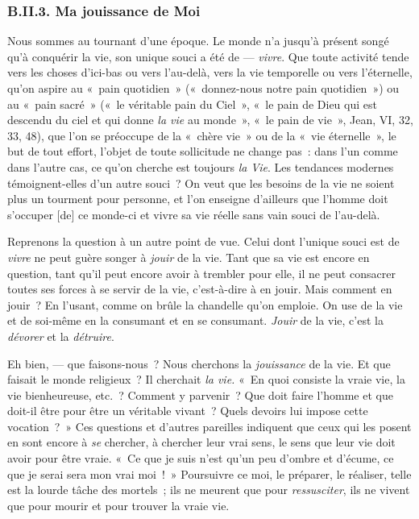 \documentclass[french,twoside]{book} %
\newcommand\corr[1]{#1}
\begin{document}
\subsubsection[{B.II.3. Ma jouissance de Moi}]{B.II.3. Ma jouissance de Moi}
\noindent Nous sommes au tournant d’une époque. Le monde n’a jusqu’à présent songé qu’à conquérir la vie, son unique souci a été de — \emph{vivre}. Que toute activité tende vers les choses d’ici-bas ou vers l’au-delà, vers la vie temporelle ou vers l’éternelle, qu’on aspire au « pain quotidien » (« donnez-nous notre pain quotidien ») ou au « pain sacré » (« le véritable pain du Ciel », « le pain de Dieu qui est descendu du ciel et qui donne \emph{la vie} au monde », « le pain de vie », Jean, VI, 32, 33, 48), que l’on se préoccupe de la « chère vie » ou de la « vie éternelle », le but de tout effort, l’objet de toute sollicitude ne change pas : dans l’un comme dans l’autre cas, ce qu’on cherche est toujours \emph{la Vie}. Les tendances modernes témoignent-elles d’un autre souci ? On veut que les besoins de la vie ne soient plus un tourment pour personne, et l’on enseigne d’ailleurs que l’homme doit s’occuper [{\corr de}] ce monde-ci et vivre sa vie réelle sans vain souci de l’au-delà.\par
Reprenons la question à un autre point de vue. Celui dont l’unique souci est de \emph{vivre} ne peut guère  songer à \emph{jouir} de la vie. Tant que sa vie est encore en question, tant qu’il peut encore avoir à trembler pour elle, il ne peut consacrer toutes ses forces à se servir de la vie, c’est-à-dire à en jouir. Mais comment en jouir ? En l’usant, comme on brûle la chandelle qu’on emploie. On use de la vie et de soi-même en la consumant et en se consumant. \emph{Jouir} de la vie, c’est la \emph{dévorer} et la \emph{détruire}.\par
Eh bien, — que faisons-nous ? Nous cherchons la \emph{jouissance} de la vie. Et que faisait le monde religieux ? Il cherchait \emph{la vie.} « En quoi consiste la vraie vie, la vie bienheureuse, etc. ? Comment y parvenir ? Que doit faire l’homme et que doit-il être pour être un véritable vivant ? Quels devoirs lui impose cette vocation ? » Ces questions et d’autres pareilles indiquent que ceux qui les posent en sont encore à \emph{se} chercher, à chercher leur vrai sens, le sens que leur vie doit avoir pour être vraie. « Ce que je suis n’est qu’un peu d’ombre et d’écume, ce que je serai sera mon vrai moi ! » Poursuivre ce moi, le préparer, le réaliser, telle est la lourde tâche des mortels ; ils ne meurent que pour \emph{ressusciter}, ils ne vivent que pour mourir et pour trouver la vraie vie.\par
\end{document}
